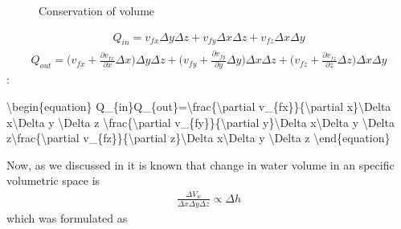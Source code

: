 \documentclass[letterpaper,10pt,english]{jupyterBook}
\begin{document}
\begin{figure}[htbp]
\centering
\capstart

\noindent{}
\caption{Conservation of volume}\label{\detokenize{content/flow/L7/17_quantify_flow:id1}}\end{figure}

\sphinxAtStartPar
{}
\begin{equation*}
\begin{split}
Q_{in} = v_{fx}\Delta y \Delta z + v_{fy}\Delta x \Delta z + v_{fz}\Delta x \Delta y 
\end{split}
\end{equation*}
\sphinxAtStartPar
{}
\begin{equation*}
\begin{split}
Q_{out} = \bigg(v_{fx}+\frac{\partial v_{fx}}{\partial x} \Delta x\bigg)\Delta y \Delta z + 
\bigg(v_{fy}+\frac{\partial v_{fy}}{\partial y} \Delta y\bigg)\Delta x \Delta z +
\bigg(v_{fz}+\frac{\partial v_{fz}}{\partial z} \Delta z\bigg)\Delta x \Delta y
\end{split}
\end{equation*}
\sphinxAtStartPar
{}:

\sphinxAtStartPar
\textbackslash{}begin\{equation\}
Q\_\{in\}\sphinxhyphen{}Q\_\{out\}=\sphinxhyphen{}\textbackslash{}frac\{\textbackslash{}partial v\_\{fx\}\}\{\textbackslash{}partial x\}\textbackslash{}Delta x\textbackslash{}Delta y \textbackslash{}Delta z
\sphinxhyphen{}\textbackslash{}frac\{\textbackslash{}partial v\_\{fy\}\}\{\textbackslash{}partial y\}\textbackslash{}Delta x\textbackslash{}Delta y \textbackslash{}Delta z\sphinxhyphen{}\textbackslash{}frac\{\textbackslash{}partial v\_\{fz\}\}\{\textbackslash{}partial z\}\textbackslash{}Delta x\textbackslash{}Delta y \textbackslash{}Delta z
\textbackslash{}end\{equation\}

\sphinxAtStartPar
Now, as we discussed in {\hyperref[\detokenize{content/flow/L3/13_gw_storage::doc}]{}} it is known that change in water volume in an specific volumetric space is
\begin{equation*}
\begin{split}
\frac{\Delta V_w}{\Delta x \Delta y \Delta z} \propto \Delta h
\end{split}
\end{equation*}
\sphinxAtStartPar
which was formulated as
\end{document}
